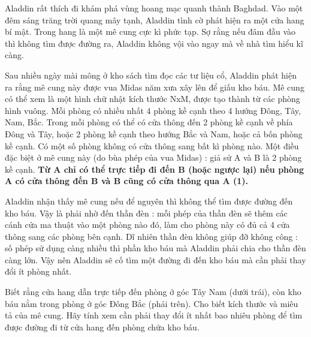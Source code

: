 Aladdin rất thích đi khám phá vùng hoang mạc quanh thành Baghdad. Vào một đêm sáng trăng trời quang mây tạnh, Aladdin tình cờ phát hiện ra một cửa hang bí mật. Trong hang là một mê cung cực kì phức tạp. Sợ rằng nếu đâm đầu vào thì không tìm được đường ra, Aladdin không vội vào ngay mà về nhà tìm hiểu kĩ càng.

Sau nhiều ngày mài mông ở kho sách tìm đọc các tư liệu cổ, Aladdin phát hiện ra rằng mê cung này được vua Midas năm xưa xây lên để giấu kho báu. Mê cung có thể xem là một hình chữ nhật kích thước NxM, được tạo thành từ các phòng hình vuông. Mỗi phòng có nhiều nhất 4 phòng kề cạnh theo 4 hướng Đông, Tây, Nam, Bắc. Trong mỗi phòng có thể có cửa thông đến 2 phòng kề cạnh về phía Đông và Tây, hoặc 2 phòng kề cạnh theo hướng Bắc và Nam, hoặc cả bốn phòng kề cạnh. Có một số phòng không có cửa thông sang bất kì phòng nào. Một điều đặc biệt ở mê cung này (do bùa phép của vua Midas) : giả sử A và B là 2 phòng kề cạnh. \textbf{Từ A chỉ có thể trực tiếp đi đến B (hoặc ngược lại) nếu phòng A có cửa thông đến B và B cũng có cửa thông qua A (1).}

Aladdin nhận thấy mê cung nếu để nguyên thì không thể tìm được đường đến kho báu. Vậy là phải nhờ đến thần đèn : mỗi phép của thần đèn sẽ thêm các cánh cửa ma thuật vào một phòng nào đó, làm cho phòng này có đủ cả 4 cửa thông sang các phòng bên cạnh. Dĩ nhiên thần đèn không giúp đỡ không công : số phép sử dụng càng nhiều thì phần kho báu mà Aladdin phải chia cho thần đèn càng lớn. Vậy nên Aladdin sẽ cố tìm một đường đi đến kho báu mà cần phải thay đổi ít phòng nhất.

Biết rằng cửa hang dẫn trực tiếp đến phòng ở góc Tây Nam (dưới trái), còn kho báu nằm trong phòng ở góc Đông Bắc (phải trên).
Cho biết kích thước và miêu tả của mê cung. Hãy tính xem cần phải thay đổi ít nhất bao nhiêu phòng để tìm được đường đi từ cửa hang đến phòng chứa kho báu.